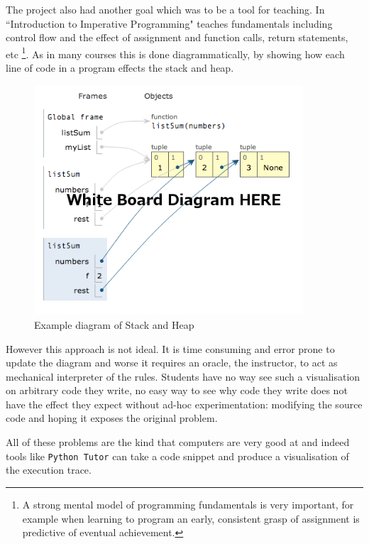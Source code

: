 \documentclass[11pt, a4paper]{article}
\newcommand{\cmd}[1]{{\tt #1}}
\begin{document}
The project also had another goal which was to be a tool for teaching.
In ``Introduction to Imperative Programming" teaches fundamentals including control flow and the effect of assignment and function calls, return statements, etc
\footnote{A strong mental model of programming fundamentals is very important, for example when learning to program an early, consistent grasp of assignment is predictive of eventual achievement\cite{saeed09}.}.
As in many courses this is done diagrammatically, by showing how each line of code in a program effects the stack and heap.

\begin{figure}[h!]
\centering
\includegraphics[width=100mm]{whiteboard.png}
\caption{Example diagram of Stack and Heap}
\end{figure}

However this approach is not ideal.
It is time consuming and error prone to update the diagram and worse it requires an oracle, the instructor, to act as mechanical interpreter of the rules.
Students have no way see such a visualisation on arbitrary code they write, no easy way to see why code they write does not have the effect they expect without ad-hoc experimentation: modifying the source code and hoping it exposes the original problem.

All of these problems are the kind that computers are very good at and indeed tools like \cmd{Python Tutor}\cite{pythontutor} can take a code snippet and produce a visualisation of the execution trace. 
\end{document}
